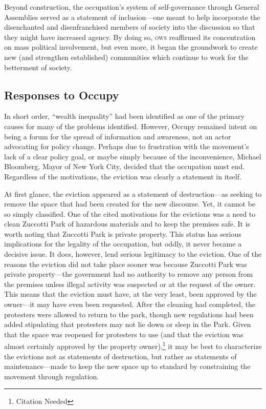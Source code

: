 \documentclass{article}
\begin{document}
Beyond construction, the occupation's system of self-governance through General Assemblies served as a statement of inclusion---one meant to help incorporate the disenchanted and disenfranchised members of society into the discussion so that they might have increased agency.
By doing so, \textsc{ows} reaffirmed its concentration on mass political involvement, but even more, it began the groundwork to create new (and strengthen established) communities which continue to work for the betterment of society.

\subsection{Responses to Occupy}
In short order, ``wealth inequality'' had been identified as one of the primary causes for many of the problems identified.
However, Occupy remained intent on being a forum for the spread of information and awareness, not an actor advocating for policy change.
Perhaps due to frustration with the movement's lack of a clear policy goal, or maybe simply because of the inconvenience, Michael Bloomberg, Mayor of New York City, decided that the occupation must end.
Regardless of the motivations, the eviction was clearly a statement in itself.

At first glance, the eviction appeared as a statement of destruction---as seeking to remove the space that had been created for the new discourse.
Yet, it cannot be so simply classified.
One of the cited motivations for the evictions was a need to clean Zuccotti Park of hazardous materials and to keep the premises safe.
It is worth noting that Zuccotti Park is private property. 
This status has serious implications for the legality of the occupation, but oddly, it never became a decisive issue.
It does, however, lend serious legitimacy to the eviction.
One of the reasons the eviction did not take place sooner was because Zuccotti Park was private property---the government had no authority to remove any person from the premises unless illegal activity was suspected or at the request of the owner. 
This means that the eviction must have, at the very least, been approved by the owner---it may have even been requested.
After the cleaning had completed, the protesters were allowed to return to the park, though new regulations had been added stipulating that protesters may not lie down or sleep in the Park.
Given that the space was reopened for protesters to use (and that the eviction was almost certainly approved by the property owner),\footnote{Citation Needed} it may be best to characterize the evictions not as statements of destruction, but rather as statements of maintenance---made to keep the new space up to standard by constraining the movement through regulation.
\end{document}
